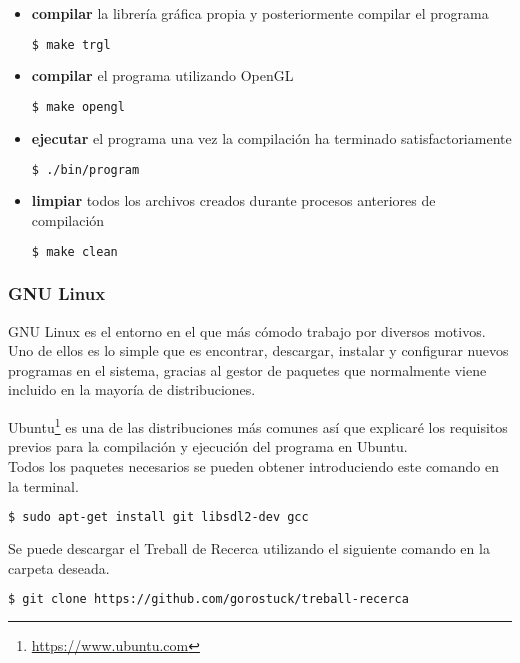 \begin{itemize}
\item{\textbf{compilar} la librería gráfica propia y posteriormente compilar el programa}
\begin{lstlisting}[language=bash]
  $ make trgl
\end{lstlisting}
\item{\textbf{compilar} el programa utilizando OpenGL}
\begin{lstlisting}[language=bash]
  $ make opengl
\end{lstlisting}
\item{\textbf{ejecutar} el programa una vez la compilación ha terminado satisfactoriamente}
\begin{lstlisting}[language=bash]
  $ ./bin/program
\end{lstlisting}
\item{\textbf{limpiar} todos los archivos creados durante procesos anteriores de compilación}
\begin{lstlisting}[language=bash]
  $ make clean
\end{lstlisting}
\end{itemize}

\subsubsection{GNU Linux}
GNU Linux es el entorno en el que más cómodo trabajo por diversos motivos. Uno de ellos es lo simple que es encontrar, descargar, instalar y configurar nuevos programas en el sistema, gracias al gestor de paquetes que normalmente viene incluido en la mayoría de distribuciones.


Ubuntu\footnote{\url{https://www.ubuntu.com}} es una de las distribuciones más comunes así que explicaré los requisitos previos para la compilación y ejecución del programa en Ubuntu.
\\ Todos los paquetes necesarios se pueden obtener introduciendo este comando en la terminal.
\begin{lstlisting}[language=bash]
  $ sudo apt-get install git libsdl2-dev gcc
\end{lstlisting}
Se puede descargar el Treball de Recerca utilizando el siguiente comando en la carpeta deseada.
\begin{lstlisting}[language=bash]
  $ git clone https://github.com/gorostuck/treball-recerca
\end{lstlisting}


